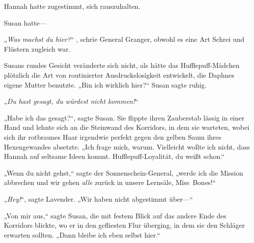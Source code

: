 Hannah hatte zugestimmt, sich rauszuhalten.

Susan hatte—

\later

„\emph{Was machst du hier?}“ , schrie General Granger, obwohl es eine Art Schrei und Flüstern zugleich war.

Susans rundes Gesicht veränderte sich nicht, als hätte das Hufflepuff-Mädchen plötzlich die Art von routinierter Ausdruckslosigkeit entwickelt, die Daphnes eigene Mutter benutzte. „Bin ich wirklich hier?“ Susan sagte ruhig.

„\emph{Du hast gesagt, du würdest nicht kommen!}“

„Habe ich das gesagt?“, sagte Susan. Sie flippte ihren Zauberstab lässig in einer Hand und lehnte sich an die Steinwand des Korridors, in dem sie warteten, wobei sich ihr rotbraunes Haar irgendwie perfekt gegen den gelben Saum ihres Hexengewandes absetzte. „Ich frage mich, warum. Vielleicht wollte ich nicht, dass Hannah auf seltsame Ideen kommt. Hufflepuff-Loyalität, du weißt schon.“

„Wenn du nicht gehst,“ sagte der Sonnenschein-General, „werde ich die Mission abbrechen und wir gehen \emph{alle} zurück in unsere Lernsäle, Miss~Bones!“

„\emph{Hey!}“, sagte Lavender. „Wir haben nicht abgestimmt über—“

„Von mir aus,“ sagte Susan, die mit festem Blick auf das andere Ende des Korridors blickte, wo er in den gefliesten Flur überging, in dem sie den Schläger erwarten sollten. „Dann bleibe ich eben selbst hier.“

